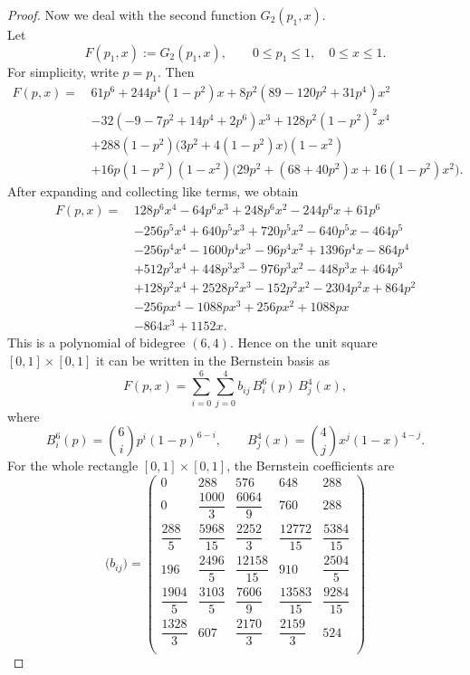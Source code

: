 \documentclass[10pt,a4paper]{amsart}
\begin{document}
\begin{proof}
Now we deal with the second function $G_{2}(p_1, x)$.\\[2mm]
Let
\[
F(p_1,x):=G_2(p_1,x),
\qquad 0\le p_1\le 1,\quad 0\le x\le 1.
\]
For simplicity, write $p=p_{1}$. Then
\[
\begin{aligned}
	F(p,x)=\,&61 p^6 + 244 p^4 (1-p^2)x + 8p^2(89-120p^2+31p^4)x^2 \\
	&-32(-9-7p^2+14p^4+2p^6)x^3 + 128p^2(1-p^2)^2x^4 \\
	&+288(1-p^2)\bigl(3p^2+4(1-p^2)x\bigr)(1-x^2) \\
	&+16p(1-p^2)(1-x^2)\bigl(29p^2+(68+40p^2)x+16(1-p^2)x^2\bigr).
\end{aligned}
\]
After expanding and collecting like terms, we obtain
\[
\begin{aligned}
	F(p,x)=\,&128p^{6}x^{4}-64p^{6}x^{3}+248p^{6}x^{2}-244p^{6}x+61p^{6} \\
	&-256p^{5}x^{4}+640p^{5}x^{3}+720p^{5}x^{2}-640p^{5}x-464p^{5} \\
	&-256p^{4}x^{4}-1600p^{4}x^{3}-96p^{4}x^{2}+1396p^{4}x-864p^{4} \\
	&+512p^{3}x^{4}+448p^{3}x^{3}-976p^{3}x^{2}-448p^{3}x+464p^{3} \\
	&+128p^{2}x^{4}+2528p^{2}x^{3}-152p^{2}x^{2}-2304p^{2}x+864p^{2} \\
	&-256px^{4}-1088px^{3}+256px^{2}+1088px \\
	&-864x^{3}+1152x.
\end{aligned}
\]
This is a polynomial of bidegree $(6,4)$. Hence on the unit square $[0,1]\times[0, 1]$ it can be written in the Bernstein basis as
\[
F(p,x)=\sum_{i=0}^{6}\sum_{j=0}^{4} b_{ij}\,B_i^6(p)\,B_j^4(x),
\]
where
\[
B_i^6(p)=\binom{6}{i}p^i(1-p)^{6-i},
\qquad
B_j^4(x)=\binom{4}{j}x^j(1-x)^{4-j}.
\]
For the whole rectangle \([0,1]\times[0,1]\), the Bernstein coefficients are\\
\[
\bigl(b_{ij}\bigr)=
\begin{pmatrix}
	0 & 288 & 576 & 648 & 288\\[5mm]
	0 & \dfrac{1000}{3} & \dfrac{6064}{9} & 760 & 288\\[5mm]
	\dfrac{288}{5} & \dfrac{5968}{15} & \dfrac{2252}{3} & \dfrac{12772}{15} & \dfrac{5384}{15}\\[5mm]
	196 & \dfrac{2496}{5} & \dfrac{12158}{15} & 910 & \dfrac{2504}{5}\\[5mm]
	\dfrac{1904}{5} & \dfrac{3103}{5} & \dfrac{7606}{9} & \dfrac{13583}{15} & \dfrac{9284}{15}\\[5mm]
	\dfrac{1328}{3} & 607 & \dfrac{2170}{3} & \dfrac{2159}{3} & 524\\[5mm]

\end{pmatrix}\]
\end{proof}
\end{document}
